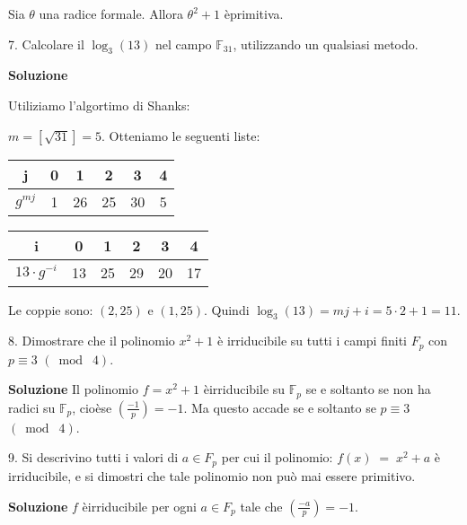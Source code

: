 \documentclass[italian,a4paper,10pt]{report}
\newcommand{\e}{\`e\;}
\newcommand{\F}{\mathbb{F}}
\begin{document}
Sia $\theta$ una radice formale. Allora $\theta^2+1$ \e primitiva.
\vspace{5mm}









7. Calcolare il $\log_3(13)$ nel campo $\F_{31}$, utilizzando un
qualsiasi metodo. \vspace{5mm}

{\bf Soluzione}

Utiliziamo l'algortimo di Shanks:

$m= [\sqrt{31} ]= 5$. Otteniamo le seguenti liste:
\begin{center}
\begin{tabular}{|c|c|c|c|c|c|}
  \hline
  j & 0 & 1 & 2 & 3 & 4 \\
  \hline
  $g^{mj}$ & 1 & 26 & 25 & 30 & 5 \\ \hline
\end{tabular}
\end{center}
\begin{center}
\begin{tabular}{|c|c|c|c|c|c|}
  \hline
  i& 0 & 1 & 2 & 3 & 4 \\
  \hline
 $ 13\cdot g^{-i}$ & 13 & 25 & 29 & 20 &17 \\ \hline
\end{tabular}
\end{center}

Le coppie sono: $(2,25)$ e $(1,25)$. Quindi $\log_3(13) = mj + i =
5 \cdot 2 + 1=11$. \vspace{5mm}

8. Dimostrare che il polinomio $x^2+1$ \`{e} irriducibile su tutti
i campi finiti $F_p$ con $p \equiv 3$ $(\bmod\;4)$. \vspace{5mm}

{\bf Soluzione} Il polinomio $f=x^2+1$ \e irriducibile su $\F_p$
se e soltanto se non ha radici su $\F_p$, cio\e se $\left(
\frac{-1}{p} \right) = -1$. Ma questo accade se e soltanto se $p
\equiv 3$ $(\bmod\;4)$. \vspace{5mm}


9. Si descrivino tutti i valori di $a \in F_p$ per cui il
polinomio: $ f(x) \; =\; x^2 + a $ \`{e} irriducibile, e si
dimostri che tale polinomio non pu\`{o} mai essere primitivo.

{\bf Soluzione} $f$ \e irriducibile per ogni $a\in F_p$ tale che
$\left( \frac{-a}{p}\right) = -1$.
\end{document}

